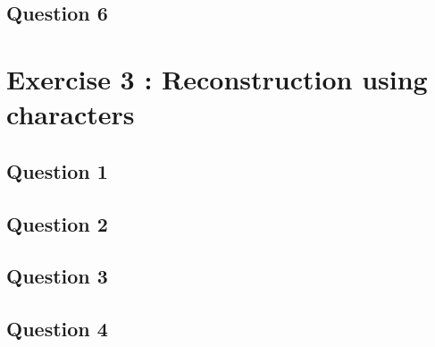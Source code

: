 \documentclass[]{article}
\begin{document}
\subsection{Question 6}
\section{Exercise 3 : Reconstruction using characters}
\subsection{Question 1}
\subsection{Question 2}
\subsection{Question 3}
\subsection{Question 4}
\end{document}

